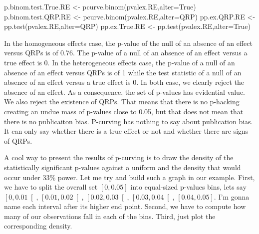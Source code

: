 \documentclass[
]{book}
\newenvironment{Shaded}{\begin{snugshade}}{\end{snugshade}}
\newcommand{\AttributeTok}[1]{\textcolor[rgb]{0.77,0.63,0.00}{#1}}
\newcommand{\FunctionTok}[1]{\textcolor[rgb]{0.00,0.00,0.00}{#1}}
\newcommand{\NormalTok}[1]{#1}
\newcommand{\OtherTok}[1]{\textcolor[rgb]{0.56,0.35,0.01}{#1}}
\newcommand{\StringTok}[1]{\textcolor[rgb]{0.31,0.60,0.02}{#1}}
\theoremstyle{definition}
\theoremstyle{definition}
\theoremstyle{definition}
\theoremstyle{definition}
\theoremstyle{remark}
\begin{document}
\begin{Shaded}
\begin{Highlighting}[]
\NormalTok{p.binom.test.True.RE }\OtherTok{\textless{}{-}} \FunctionTok{pcurve.binom}\NormalTok{(pvalex.RE,}\AttributeTok{alter=}\StringTok{\textquotesingle{}True\textquotesingle{}}\NormalTok{)}
\NormalTok{p.binom.test.QRP.RE }\OtherTok{\textless{}{-}} \FunctionTok{pcurve.binom}\NormalTok{(pvalex.RE,}\AttributeTok{alter=}\StringTok{\textquotesingle{}QRP\textquotesingle{}}\NormalTok{)}
\NormalTok{pp.ex.QRP.RE }\OtherTok{\textless{}{-}} \FunctionTok{pp.test}\NormalTok{(pvalex.RE,}\AttributeTok{alter=}\StringTok{\textquotesingle{}QRP\textquotesingle{}}\NormalTok{)}
\NormalTok{pp.ex.True.RE }\OtherTok{\textless{}{-}} \FunctionTok{pp.test}\NormalTok{(pvalex.RE,}\AttributeTok{alter=}\StringTok{\textquotesingle{}True\textquotesingle{}}\NormalTok{)}
\end{Highlighting}
\end{Shaded}

In the homogeneous effects case, the p-value of the null of an absence of an effect versus QRPs is of 0.76.
The p-value of a null of an absence of an effect versus a true effect is 0.
In the heterogeneous effects case, the p-value of a null of an absence of an effect versus QRPs is of 1 while the test statistic of a null of an absence of an effect versus a true effect is 0.
In both case, we clearly reject the absence of an effect.
As a consequence, the set of p-values has evidential value.
We also reject the existence of QRPs.
That means that there is no p-hacking creating an undue mass of p-values close to 0.05, but that does not mean that there is no publicaiton bias.
P-curving has nothing to say about publication bias.
It can only say whether there is a true effect or not and whether there are signs of QRPs.

A cool way to present the results of p-curving is to draw the density of the statistically significant p-values against a uniform and the density that would occur under 33\% power.
Let me try and build such a graph in our example.
First, we have to split the overall set \(\left[0,0.05\right]\) into equal-sized p-values bins, lets say \(\left[0,0.01\right[\), \(\left[0.01,0.02\right[\), \(\left[0.02,0.03\right[\), \(\left[0.03,0.04\right[\), \(\left[0.04,0.05\right]\).
I'm gonna name each interval after its higher end point.
Second, we have to compute how many of our observations fall in each of the bins.
Third, just plot the corresponding density.
\end{document}
